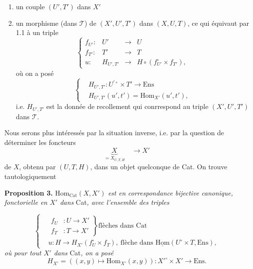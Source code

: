 \documentclass[11pt]{article}
\newcommand{\printedpage}[1]{\marginpar{\footnotesize p.~#1}}
\newcommand{\msp}[1]{\marginpar{\footnotesize [#1]}}
\newcommand{\uHom}{\underline{\mathrm{Hom}}}
\newcommand{\Hom}{\mathrm{Hom}}
\newcommand{\Ens}{\mathrm{Ens}}
\begin{document}
\begin{enumerate}[label={}]
\item[$1^\circ$)] un couple $(U',T')$ dans $X'$
\item[$2^\circ$)] un morphisme (dans $\mathcal{T}$) de $(X',U',T')$ dans $(X,U,T)$, ce qui équivaut par 1.1 à un triple
\[
\left\{\begin{array}{rccl}
f_{U'} : & U' & \longrightarrow & U\\[1ex]
f_{T'} : & T' & \longrightarrow & T\\[1ex]
u : & H_{U',T'} & \longrightarrow & H \circ (f_{U'}^\circ \times f_{T'}),
\end{array}\right.
\]
où on a posé
\[
\left\{\begin{aligned}
&H_{U',T'} : U^{\prime\circ} \times T' \longrightarrow \mathrm{Ens}\\[1ex]
&H_{U',T'}(u',t') = \mathrm{Hom}_{X'}(u',t'),
\end{aligned}\right.
\]
i.e. $H_{U',T'}$ est la donnée de recollement qui conrrespond au triple $(X',U',T')$ dans $\mathcal{T}$. %
\end{enumerate}

\msp{page 66}

Nous serons plus intéressés par la situation inverse, i.e. par la question de déterminer les foncteurs
\[
\underbrace{X}_{= X_{U,T,H}} \quad \longrightarrow X'
\]
de $X$, obtenu par $(U,T,H)$, dans un objet quelconque de Cat. On trouve tautologiquement

\textbf{Proposition 3.} $\mathrm{Hom}_{\mathrm{Cat}}(X,X')$ \textit{est en correspondance bijective canonique, fonctorielle en $X'$ dans} Cat\textit{, avec l'ensemble des triples}

\printedpage{48}

\[
\left\{
\begin{aligned}
&\left.\begin{aligned} f_U &: U \longrightarrow X' \\ f_T &: T \longrightarrow X' \end{aligned}\right\}\text{flèches dans Cat}\\
&u : H \longrightarrow H_{X'}(f_U^{\circ}\times f_T),\ \text{flèche dans } \uHom(U^{\circ}\times T,\Ens),
\end{aligned}
\right.
\tag*{}
\]
\textit{où pour tout $X'$ dans} Cat\textit{, on a posé}
\[
H_{X'} = ((x,y)\longmapsto \Hom_{X'}(x,y)) : X'^{\circ}\times X' \longrightarrow \Ens.
\]
\end{document}
